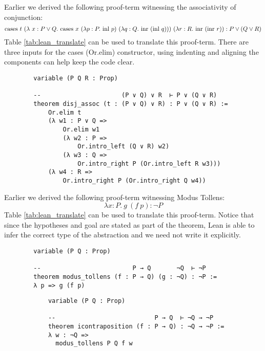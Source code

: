\documentclass{book}
\begin{document}
    \begin{eg}
        
        Earlier we derived the following proof-term witnessing the associativity of conjunction:
        $$ \text{cases} \ t \ (\lambda \ x : P \lor Q. \ \text{cases} \ x \ (\lambda p : P. \ \text{inl} \ p) \ (\lambda q : Q. \ \text{inr} \ (\text{inl} \ q))) \ (\lambda r : R. \ \text{inr} \ (\text{inr} \ r)) : P \lor (Q \lor R) $$
        Table \ref{tab:lean_translate} can be used to translate this proof-term. There are three inputs for the cases (Or.elim) constructor, using indenting and aligning the components can help keep the code clear. 

        \begin{lstlisting}
        variable (P Q R : Prop)
        
        --                      (P ∨ Q) ∨ R  ⊢ P ∨ (Q ∨ R)
        theorem disj_assoc (t : (P ∨ Q) ∨ R) : P ∨ (Q ∨ R) :=
            Or.elim t
            (λ w1 : P ∨ Q =>
                Or.elim w1
                (λ w2 : P =>
                    Or.intro_left (Q ∨ R) w2)
                (λ w3 : Q =>
                    Or.intro_right P (Or.intro_left R w3)))
            (λ w4 : R =>
                Or.intro_right P (Or.intro_right Q w4))
        \end{lstlisting}        
    \end{eg}

    \begin{eg}
        
        Earlier we derived the following proof-term witnessing Modus Tollens:
        $$ \lambda x : P. \ g \ (f \ p) : \lnot P $$
        Table \ref{tab:lean_translate} can be used to translate this proof-term. Notice that since the hypotheses and goal are stated as part of the theorem, Lean is able to infer the correct type of the abstraction and we need not write it explicitly. 

        \begin{lstlisting}
        variable (P Q : Prop)
        
        --                         P → Q       ¬Q  ⊢ ¬P
        theorem modus_tollens (f : P → Q) (g : ¬Q) : ¬P :=
        λ p => g (f p)
        \end{lstlisting}        
    \end{eg}

    \begin{eg} [Contraposition]
        \begin{lstlisting}
            variable (P Q : Prop)
            
            --                           P → Q  ⊢ ¬Q → ¬P
            theorem icontraposition (f : P → Q) : ¬Q → ¬P :=
            λ w : ¬Q =>
              modus_tollens P Q f w
            \end{lstlisting}    
    \end{eg}
    
\end{document}
